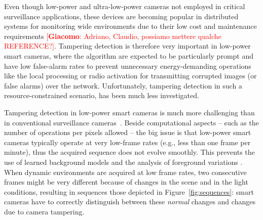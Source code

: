 \documentclass{llncs}
\newcommand{\gi}[1]{{\textcolor{red}{[\small \textbf{Giacomo}: #1]}}}
\begin{document}
Even though low-power and ultra-low-power cameras not employed in critical surveillance applications, these devices are becoming popular in distributed systems for monitoring wide environments due to their low cost and maintenance requirements \gi{Adriano, Claudio, possiamo mettere qualche REFERENCE?}. Tampering detection is therefore very important in low-power smart cameras, where the algorithm are expected to be particularly prompt and have low false-alarm rates to prevent unnecessary energy-demanding operations like the local processing or radio activation for transmitting corrupted images (or false alarms) over the network. Unfortunately, tampering detection in such a resource-constrained scenario, has been much less investigated.

Tampering detection in low-power smart cameras is much more challenging than in conventional surveillance cameras~\cite{perrig2004security}. Beside computational aspects -- such as the number of operations per pixels allowed -- the big issue is that low-power smart cameras typically operate at very low-frame rates (e.g., less than one frame per minute), thus the acquired sequence does not evolve smoothly. This prevents the use of learned background models and the analysis of foreground variations \cite{piccardi2004background}. When dynamic environments are acquired at low frame rates, two consecutive frames might be very different because of changes in the scene and in the light conditions, resulting in sequences those depicted in Figure~\ref{fig:sequences}: smart cameras have to correctly distinguish between these \emph{normal} changes and changes due to camera tampering. 

\end{document}
